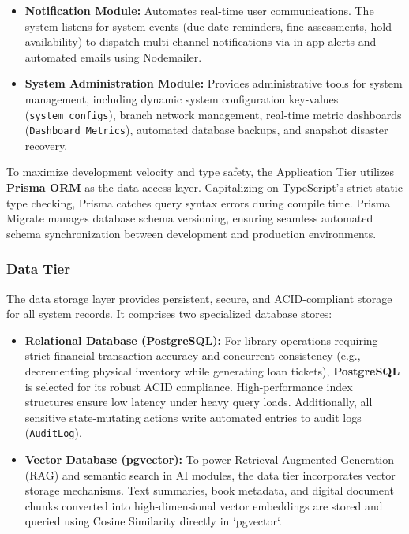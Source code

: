 \begin{itemize}
	\item \textbf{Notification Module:} Automates real-time user communications. The system listens for system events (due date reminders, fine assessments, hold availability) to dispatch multi-channel notifications via in-app alerts and automated emails using Nodemailer.

	\item \textbf{System Administration Module:} Provides administrative tools for system management, including dynamic system configuration key-values (\texttt{system\_configs}), branch network management, real-time metric dashboards (\texttt{Dashboard Metrics}), automated database backups, and snapshot disaster recovery.
\end{itemize}

To maximize development velocity and type safety, the Application Tier utilizes \textbf{Prisma ORM} as the data access layer. Capitalizing on TypeScript's strict static type checking, Prisma catches query syntax errors during compile time. Prisma Migrate manages database schema versioning, ensuring seamless automated schema synchronization between development and production environments.

\subsubsection{Data Tier}
The data storage layer provides persistent, secure, and ACID-compliant storage for all system records. It comprises two specialized database stores:

\begin{itemize}
	\item \textbf{Relational Database (PostgreSQL):} For library operations requiring strict financial transaction accuracy and concurrent consistency (e.g., decrementing physical inventory while generating loan tickets), \textbf{PostgreSQL} is selected for its robust ACID compliance. High-performance index structures ensure low latency under heavy query loads. Additionally, all sensitive state-mutating actions write automated entries to audit logs (\texttt{AuditLog}).

	\item \textbf{Vector Database (pgvector):} To power Retrieval-Augmented Generation (RAG) and semantic search in AI modules, the data tier incorporates vector storage mechanisms. Text summaries, book metadata, and digital document chunks converted into high-dimensional vector embeddings are stored and queried using Cosine Similarity directly in `pgvector`.
\end{itemize}

